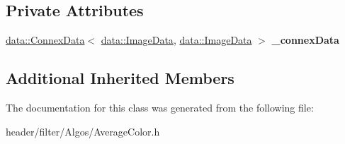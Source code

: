 \subsection*{Private Attributes}
\begin{DoxyCompactItemize}
\item 
\mbox{\label{classfilter_1_1algos_1_1_average_color_af480ca1182ca83f8d54da67cc88eb118}} 
\hyperlink{classfilter_1_1data_1_1_connex_data}{data\+::\+Connex\+Data}$<$ \hyperlink{classfilter_1_1data_1_1_image_data}{data\+::\+Image\+Data}, \hyperlink{classfilter_1_1data_1_1_image_data}{data\+::\+Image\+Data} $>$ {\bfseries \+\_\+connex\+Data}
\end{DoxyCompactItemize}
\subsection*{Additional Inherited Members}


The documentation for this class was generated from the following file\+:\begin{DoxyCompactItemize}
\item 
header/filter/\+Algos/Average\+Color.\+h\end{DoxyCompactItemize}
